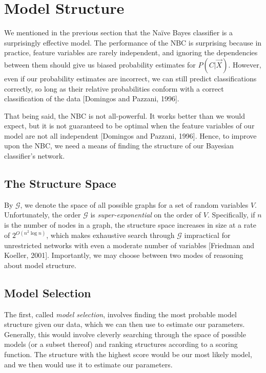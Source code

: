 \documentclass[12pt,twoside]{reedthesis}
\begin{document}
	\section{Model Structure}
	We mentioned in the previous section that the Na\"{i}ve Bayes classifier is a surprisingly effective model. The performance of the NBC is surprising because in practice, feature variables are rarely independent, and ignoring the dependencies between them should give us biased probability estimates for $P(C | \vec{X})$. However, even if our probability estimates are incorrect, we can still predict classifications correctly, so long as their relative probabilities conform with a correct classification of the data [Domingos and Pazzani, 1996].
	
	
	That being said, the NBC is not all-powerful. It works better than we would expect, but it is not guaranteed to be optimal when the feature variables of our model are not all independent [Domingos and Pazzani, 1996]. Hence, to improve upon the NBC, we need a means of finding the structure of our Bayesian classifier's network. 
	
	\subsection*{The Structure Space}
	By $\mathcal G$, we denote the space of all possible graphs for a set of random variables $V$.
	Unfortunately, the order $\mathcal G$ is {\em super-exponential} on the order of $V$. 
	Specifically, if $n$ is the number of nodes in a graph, the structure space increases in size at a rate of $2^{O(n^2\log{n})}$, which makes exhaustive search through $\mathcal G$ impractical for unrestricted networks with even a moderate number of variables [Friedman and Koeller, 2001].
	Importantly, we may choose between two modes of reasoning about model structure. 

	\subsection*{Model Selection}	
	The first, called {\em model selection}, involves finding the most probable model structure given our data, which we can then use to estimate our parameters. Generally, this would involve cleverly searching through the space of possible models (or a subset thereof) and ranking structures according to a scoring function. The structure with the highest score would be our most likely model, and we then would use it to estimate our parameters.  
	
\end{document}
